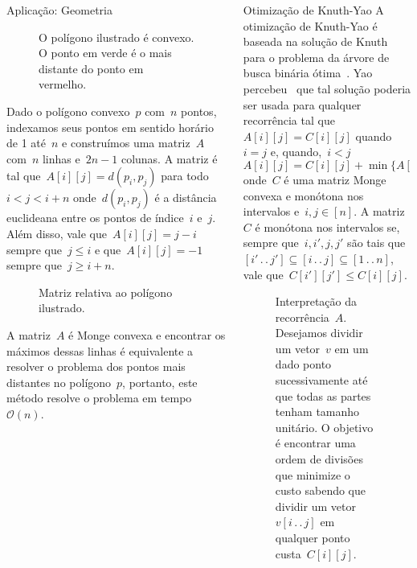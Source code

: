 \documentclass[final]{beamer}
\newcommand{\Cl}[1]{\ensuremath{\mathcal{#1}}}
\newcommand{\tdots}{\,.\,.\,}
\begin{document}
\begin{frame}[t]
\begin{columns}[t]
\begin{column}{0.60\paperwidth}
\begin{columns}[c,totalwidth=0.60\paperwidth]
\begin{column}{0.47\columnwidth}
\begin{block}{Aplicação: Geometria}
\begin{figure}[h]
    \centering
    
    \caption{O polígono ilustrado é convexo. O ponto em verde é o mais distante do ponto em vermelho.}
\end{figure}

Dado o polígono convexo~$p$ com~$n$ pontos, indexamos seus pontos em sentido horário de 1 até~$n$ e construímos uma matriz~$A$ com~$n$ linhas e~$2n - 1$ colunas. A matriz é tal que~$A[i][j] = d(p_i,p_j)$ para todo~$i < j < i + n$ onde~$d(p_i,p_j)$ é a distância euclideana entre os pontos de índice~$i$ e~$j$. Além disso, vale que~$A[i][j] = j - i$ sempre que~$j \leq i$ e que~$A[i][j] = -1$ sempre que~$j \geq i + n$.

\begin{figure}[h]
    \centering
    
    \caption{Matriz relativa ao polígono ilustrado.}
\end{figure}

A matriz~$A$ é Monge convexa e encontrar os máximos dessas linhas é equivalente a resolver o problema dos pontos mais distantes no polígono~$p$, portanto, este método resolve o problema em tempo~$\Cl{O}(n)$.
        \end{block}
    \end{column}


    \begin{column}{0.5\columnwidth}
        \begin{block}{Otimização de Knuth-Yao}
A otimização de Knuth-Yao é baseada na solução de Knuth para o problema da árvore de busca binária ótima~\cite{Knuth}. Yao percebeu~\cite{Yao} que tal solução poderia ser usada para qualquer recorrência tal que~$A[i][j] = C[i][j]$ quando~$i = j$ e, quando,~$i < j$
\begin{equation*}
A[i][j] = C[i][j] + \min\{A[i][k-1] + A[k][j] \mid k \in [i+1 \tdots j]\} 
\end{equation*}
onde~$C$ é uma matriz Monge convexa e monótona nos intervalos e~$i,j \in [n]$. A matriz~$C$ é monótona nos intervalos se, sempre que~$i,i',j,j'$ são tais que~$[i' \tdots j'] \subseteq [i \tdots j] \subseteq [1 \tdots n]$, vale que~$C[i'][j'] \leq C[i][j]$.

\begin{figure}[h]
    \centering
    
    \caption{Interpretação da recorrência~$A$. Desejamos dividir um vetor~$v$ em um dado ponto sucessivamente até que todas as partes tenham tamanho unitário. O objetivo é encontrar uma ordem de divisões que minimize o custo sabendo que dividir um vetor~$v[i\tdots j]$ em qualquer ponto custa~$C[i][j]$.}
\end{figure}


\end{block}
\end{column}
\end{columns}
\end{column}
\end{columns}
\end{frame}
\end{document}
